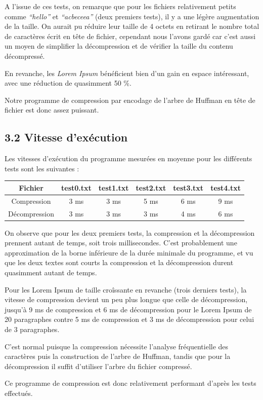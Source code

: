 \documentclass [a4paper,11pt] {report}
\begin{document}
\newpage

A l'issue de ces tests, on remarque que pour les fichiers relativement petits comme \textit{``hello''} et \textit{``acbeceea''} (deux premiers tests), il y a une légère augmentation de la taille. On aurait pu réduire leur taille de 4 octets en retirant le nombre total de caractères écrit en tête de fichier, cependant nous l'avons gardé car c'est aussi un moyen de simplifier la décompression et de vérifier la taille du contenu décompressé.

En revanche, les \textit{Lorem Ipsum} bénéficient bien d'un gain en espace intéressant, avec une réduction de quasimment 50 \%.

Notre programme de compression par encodage de l'arbre de Huffman en tête de fichier est donc assez puissant.


\subsection* {3.2\hspace{3mm} Vitesse d'exécution}

Les vitesses d'exécution du programme mesurées en moyenne pour les différents tests sont les suivantes :
\begin{center}
\begin{tabular}{|c|c|c|c|c|c|}
 \hline
Fichier & test0.txt & test1.txt & test2.txt & test3.txt & test4.txt\\
 \hline
Compression & 3 ms & 3 ms & 5 ms & 6 ms & 9 ms\\
Décompression & 3 ms & 3 ms & 3 ms & 4 ms & 6 ms\\
 \hline
\end{tabular}
\end{center}
\vspace{0.25cm}

On observe que pour les deux premiers tests, la compression et la décompression prennent autant de temps, soit trois millisecondes. C'est probablement une approximation de la borne inférieure de la durée minimale du programme, et vu que les deux textes sont courts la compression et la décompression durent quasimment autant de temps.

Pour les Lorem Ipsum de taille croîssante en revanche (trois derniers tests), la vitesse de compression devient un peu plus longue que celle de décompression, jusqu'à 9 ms de compression et 6 ms de décompression pour le Lorem Ipsum de 20 paragraphes contre 5 ms de compression et 3 ms de décompression pour celui de 3 paragraphes.

C'est normal puisque la compression nécessite l'analyse fréquentielle des caractères puis la construction de l'arbre de Huffman, tandis que pour la décompression il suffit d'utiliser l'arbre du fichier compressé.

Ce programme de compression est donc relativement performant d'après les tests effectués.
\end{document}
